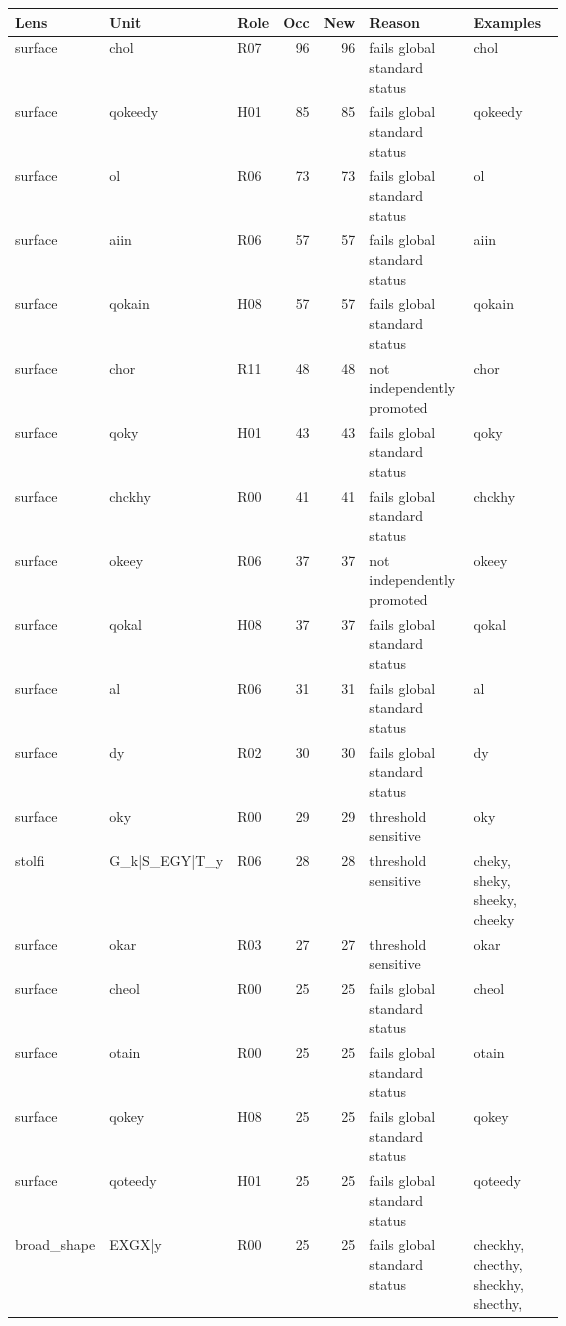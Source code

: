 \begin{tabular}{lp{0.18\linewidth}lrrp{0.22\linewidth}p{0.24\linewidth}}
\toprule
Lens & Unit & Role & Occ & New & Reason & Examples \\
\midrule
surface & chol & R07 & 96 & 96 & fails global standard status & chol \\
surface & qokeedy & H01 & 85 & 85 & fails global standard status & qokeedy \\
surface & ol & R06 & 73 & 73 & fails global standard status & ol \\
surface & aiin & R06 & 57 & 57 & fails global standard status & aiin \\
surface & qokain & H08 & 57 & 57 & fails global standard status & qokain \\
surface & chor & R11 & 48 & 48 & not independently promoted & chor \\
surface & qoky & H01 & 43 & 43 & fails global standard status & qoky \\
surface & chckhy & R00 & 41 & 41 & fails global standard status & chckhy \\
surface & okeey & R06 & 37 & 37 & not independently promoted & okeey \\
surface & qokal & H08 & 37 & 37 & fails global standard status & qokal \\
surface & al & R06 & 31 & 31 & fails global standard status & al \\
surface & dy & R02 & 30 & 30 & fails global standard status & dy \\
surface & oky & R00 & 29 & 29 & threshold sensitive & oky \\
stolfi & G\_k|S\_EGY|T\_y & R06 & 28 & 28 & threshold sensitive & cheky, sheky, sheeky, cheeky \\
surface & okar & R03 & 27 & 27 & threshold sensitive & okar \\
surface & cheol & R00 & 25 & 25 & fails global standard status & cheol \\
surface & otain & R00 & 25 & 25 & fails global standard status & otain \\
surface & qokey & H08 & 25 & 25 & fails global standard status & qokey \\
surface & qoteedy & H01 & 25 & 25 & fails global standard status & qoteedy \\
broad\_shape & EXGX|y & R00 & 25 & 25 & fails global standard status & checkhy, checthy, sheckhy, shecthy,  \\
\bottomrule
\end{tabular}
